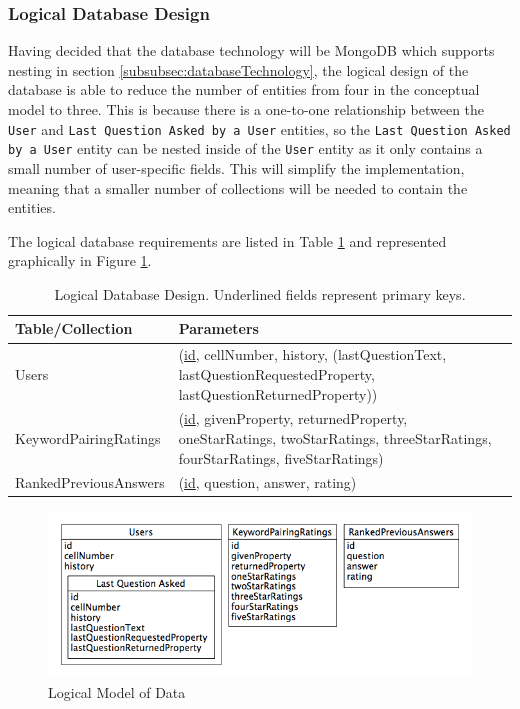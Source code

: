 \documentclass[authoryearcitations]{UoYCSproject}
\begin{document}
\subsubsection{Logical Database Design}
Having decided that the database technology will be MongoDB which supports nesting in section \ref{subsubsec:databaseTechnology}, the logical design of the database is able to reduce the number of entities from four in the conceptual model to three.  This is because there is a one-to-one relationship between the \texttt{User} and \texttt{Last Question Asked by a User} entities, so the \texttt{Last Question Asked by a User} entity can be nested inside of the \texttt{User} entity as it only contains a small number of user-specific fields.  This will simplify the implementation, meaning that a smaller number of collections will be needed to contain the entities.

The logical database requirements are listed in Table \ref{table:logicalDatabaseDesignListing} and represented graphically in Figure \ref{fig:logicalDatabaseDesignDiagram}.

\begin{table}
\begin{center}
    \begin{tabular}{| l | p{6cm} |}
    \hline
    Table/Collection & Parameters \\ \hline
    Users & (\underline{id}, cellNumber, history, (lastQuestionText, lastQuestionRequestedProperty, lastQuestionReturnedProperty)) \\ \hline
    KeywordPairingRatings & (\underline{id}, givenProperty, returnedProperty, oneStarRatings, twoStarRatings, threeStarRatings, fourStarRatings, fiveStarRatings) \\ \hline
    RankedPreviousAnswers & (\underline{id}, question, answer, rating) \\ \hline
    \end{tabular}
    \caption{Logical Database Design.  Underlined fields represent primary keys.}
    \label{table:logicalDatabaseDesignListing}
\end{center}
\end{table}

\begin{figure}[htb] 
\includegraphics[width=\linewidth]{logicalModel}
\caption{Logical Model of Data}
\label{fig:logicalDatabaseDesignDiagram}
\end{figure}
\end{document}
